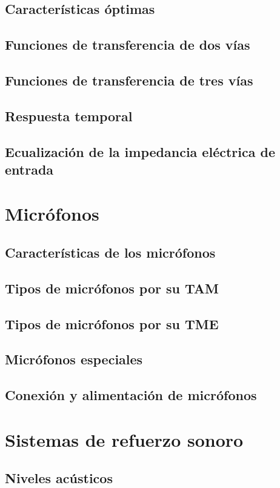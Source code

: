 \documentclass[10pt]{book}
\begin{document}
\section{Características óptimas}
\section{Funciones de transferencia de dos vías}
\section{Funciones de transferencia de tres vías}
\section{Respuesta temporal}
\section{Ecualización de la impedancia eléctrica de entrada}

\chapter{Micrófonos}
\section{Características de los micrófonos}
\section{Tipos de micrófonos por su TAM}
\section{Tipos de micrófonos por su TME}
\section{Micrófonos especiales}
\section{Conexión y alimentación de micrófonos}

\chapter{Sistemas de refuerzo sonoro}
\section{Niveles acústicos}
\end{document}
